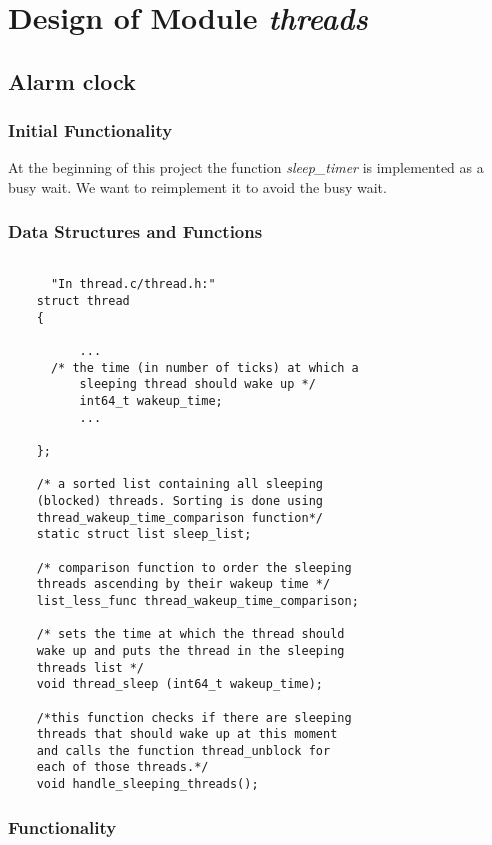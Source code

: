 
\chapter{Design of Module \textit{threads}}

\section{Alarm clock}

    \subsection{Initial Functionality}

	At the beginning of this project the function \textit{sleep\_timer} is implemented as a busy wait. We want to reimplement it to avoid the busy wait.

    \subsection{Data Structures and Functions}

    \begin{lstlisting}

      "In thread.c/thread.h:"
	struct thread
	{

	      ...
	  /* the time (in number of ticks) at which a 
	      sleeping thread should wake up */
	      int64_t wakeup_time;		
	      ...

	};
	
	/* a sorted list containing all sleeping 
	(blocked) threads. Sorting is done using 
	thread_wakeup_time_comparison function*/
	static struct list sleep_list;

	/* comparison function to order the sleeping
	threads ascending by their wakeup time */
	list_less_func thread_wakeup_time_comparison;

	/* sets the time at which the thread should 
	wake up and puts the thread in the sleeping 
	threads list */
	void thread_sleep (int64_t wakeup_time);

	/*this function checks if there are sleeping
	threads that should wake up at this moment 
	and calls the function thread_unblock for 
	each of those threads.*/
	void handle_sleeping_threads();    
    \end{lstlisting}


    \subsection{Functionality}

